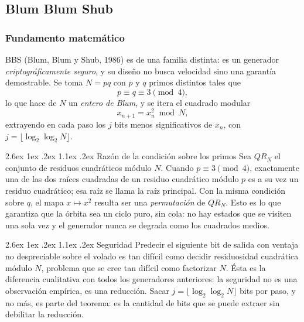 \documentclass[11pt,letterpaper]{article}
\makeatletter
\renewcommand\paragraph{\@startsection{paragraph}{4}{\z@}%
  {2.6ex \@plus 1ex \@minus .2ex}%
  {1.1ex \@plus .2ex}%
  {\normalfont\normalsize\bfseries}}
\makeatother
\begin{document}
\subsection{Blum Blum Shub}

\subsubsection{Fundamento matemático}

BBS (Blum, Blum y Shub, 1986) es de una familia distinta: es un generador
\emph{criptográficamente seguro}, y su diseño no busca velocidad sino una
garantía demostrable. Se toma $N = pq$ con $p$ y $q$ primos distintos tales
que
\begin{equation}
p \equiv q \equiv 3 \pmod 4,
\end{equation}
lo que hace de $N$ un \emph{entero de Blum}, y se itera el cuadrado modular
\begin{equation}
x_{n+1} = x_n^2 \bmod N,
\label{eq:bbs}
\end{equation}
extrayendo en cada paso los $j$ bits menos significativos de $x_n$, con
$j = \lfloor \log_2 \log_2 N \rfloor$.

\paragraph{Razón de la condición sobre los primos}
Sea $QR_N$ el conjunto de residuos
cuadráticos módulo $N$. Cuando $p \equiv 3 \pmod 4$, exactamente una de las
dos raíces cuadradas de un residuo cuadrático módulo $p$ es a su vez un
residuo cuadrático; esa raíz se llama la raíz principal. Con la misma
condición sobre $q$, el mapa $x \mapsto x^2$ resulta ser una
\emph{permutación} de $QR_N$. Esto es lo que garantiza que la órbita sea un
ciclo puro, sin cola: no hay estados que se visiten una sola vez y el
generador nunca se degrada como los cuadrados medios.

\paragraph{Seguridad} Predecir el siguiente bit de salida con ventaja no
despreciable sobre el volado es tan difícil como decidir residuosidad
cuadrática módulo $N$, problema que se cree tan difícil como factorizar $N$.
Ésta es la diferencia cualitativa con todos los generadores anteriores: la
seguridad no es una observación empírica, es una reducción. Sacar
$j = \lfloor \log_2\log_2 N\rfloor$ bits por paso, y no más, es parte del
teorema: es la cantidad de bits que se puede extraer sin debilitar la
reducción.
\end{document}
